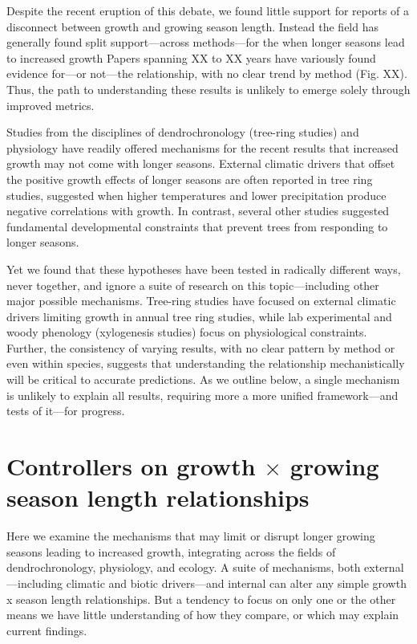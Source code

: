 \documentclass[11pt]{article}
\begin{document}
Despite the recent eruption of this debate, we found little support for reports of a disconnect between growth and growing season length. Instead the field has generally found split support---across methods---for the when longer seasons lead to increased growth  Papers spanning XX to XX years have variously found evidence for---or not---the relationship, with no clear trend by method (Fig. XX). Thus, the path to understanding these results is unlikely to emerge solely through improved metrics. 

Studies from the disciplines of dendrochronology (tree-ring studies) and physiology have readily offered mechanisms for the recent results that increased growth may not come with longer seasons. External climatic drivers that offset the positive growth effects of longer seasons are often reported in tree ring studies, suggested when higher temperatures and lower precipitation produce negative correlations with growth. In contrast, several other studies suggested fundamental developmental constraints that prevent trees from responding to longer seasons. 

Yet we found that these hypotheses have been tested in radically different ways, never together, and ignore a suite of research on this topic---including other major possible mechanisms. Tree-ring studies have focused on external climatic drivers limiting growth in annual tree ring studies, while lab experimental and woody phenology (xylogenesis studies) focus on physiological constraints. Further, the consistency of varying results, with no clear pattern by method or even within species, suggests that understanding the relationship mechanistically will be critical to accurate predictions. As we outline below, a single mechanism is unlikely to explain all results, requiring more a more unified framework---and tests of it---for progress. 
 
\section*{Controllers on growth $\times$ growing season length relationships}

Here we examine the mechanisms that may limit or disrupt longer growing seasons leading to increased growth, integrating across the fields of dendrochronology, physiology, and ecology. A suite of mechanisms, both external---including climatic and biotic drivers---and internal can alter any simple growth x season length relationships. But a tendency to focus on only one or the other means we have little understanding of how they compare, or which may explain current findings. 
\end{document}
